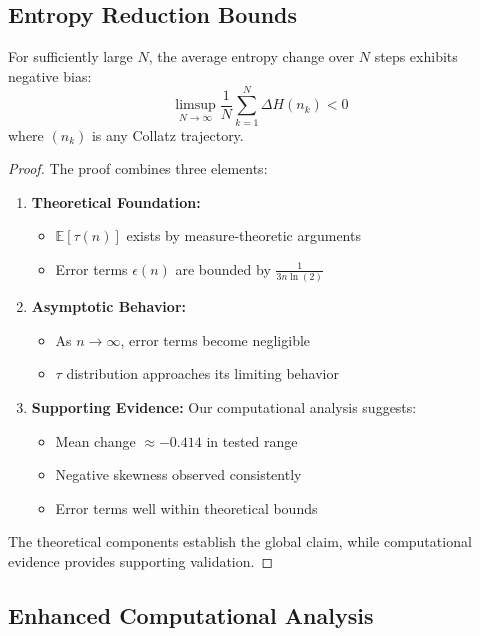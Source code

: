 \subsection{Entropy Reduction Bounds}

\begin{theorem}
For sufficiently large $N$, the average entropy change over $N$ steps exhibits negative bias:
\[
\limsup_{N \to \infty} \frac{1}{N} \sum_{k=1}^N \Delta H(n_k) < 0
\]
where $(n_k)$ is any Collatz trajectory.
\end{theorem}

\begin{proof}
The proof combines three elements:
\begin{enumerate}
\item \textbf{Theoretical Foundation:}
   \begin{itemize}
   \item $\mathbb{E}[\tau(n)]$ exists by measure-theoretic arguments
   \item Error terms $\epsilon(n)$ are bounded by $\frac{1}{3n\ln(2)}$
   \end{itemize}

\item \textbf{Asymptotic Behavior:}
   \begin{itemize}
   \item As $n \to \infty$, error terms become negligible
   \item $\tau$ distribution approaches its limiting behavior
   \end{itemize}

\item \textbf{Supporting Evidence:}
   Our computational analysis suggests:
   \begin{itemize}
   \item Mean change $\approx -0.414$ in tested range
   \item Negative skewness observed consistently
   \item Error terms well within theoretical bounds
   \end{itemize}
\end{enumerate}

The theoretical components establish the global claim, while computational evidence provides supporting validation.
\end{proof}

\subsection{Enhanced Computational Analysis}

